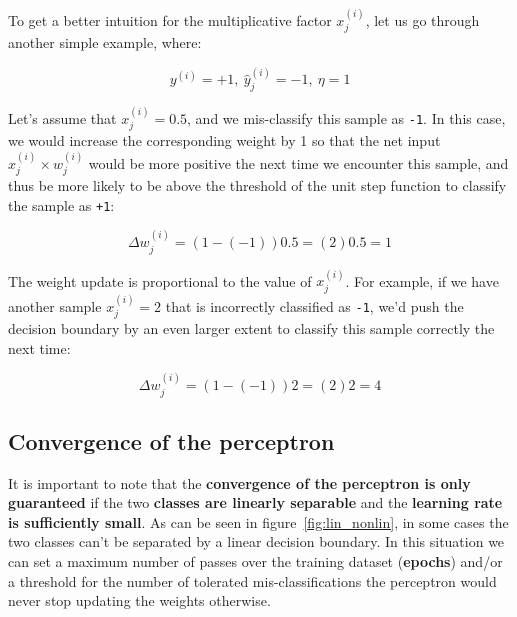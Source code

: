 \documentclass[11pt]{article}
\begin{document}
    To get a better intuition for the multiplicative factor $x_j^{(i)}$, let us go through another simple example, where:

    \begin{equation}
        \label{eq:perc_example}
        y^{(i)} = +1,~\hat{y}_j^{(i)} = -1,~\eta = 1
    \end{equation}

    Let's assume that $x_j^{(i)} = 0.5$, and we mis-classify this sample as \texttt{-1}.
    In this case, we would increase the corresponding weight by 1 so that the net input $x_j^{(i)} \times w_j^{(i)}$ would be more positive the next time we encounter this sample, and thus be more likely to be above the threshold of the unit step function to classify the sample as \texttt{+1}:

    \begin{equation}
        \label{eq:perc_example_update}
        \Delta w_j^{(i)} = \left( 1 - (-1) \right)0.5 = \left( 2 \right) 0.5 = 1
    \end{equation}

    The weight update is proportional to the value of $x_j^{(i)}$.
    For example, if we have another sample $x_j^{(i)} = 2$ that is incorrectly classified as \texttt{-1}, we'd push the decision boundary by an even larger extent to classify this sample correctly the next time:

    \begin{equation}
        \label{eq:perc_example_update2}
        \Delta w_j^{(i)} = \left( 1 - (-1) \right)2 = \left( 2 \right) 2 = 4
    \end{equation}

    \subsection{Convergence of the perceptron} \label{subsec:perc_conv}

    It is important to note that the \textbf{convergence of the perceptron is only guaranteed} if the two \textbf{classes are linearly separable} and the \textbf{learning rate is sufficiently small}.
    As can be seen in figure~\ref{fig:lin_nonlin}, in some cases the two classes can't be separated by a linear decision boundary.
    In this situation we can set a maximum number of passes over the training dataset (\textbf{epochs}) and/or a threshold for the number of tolerated mis-classifications \textemdash the perceptron would never stop updating the weights otherwise.
\end{document}
